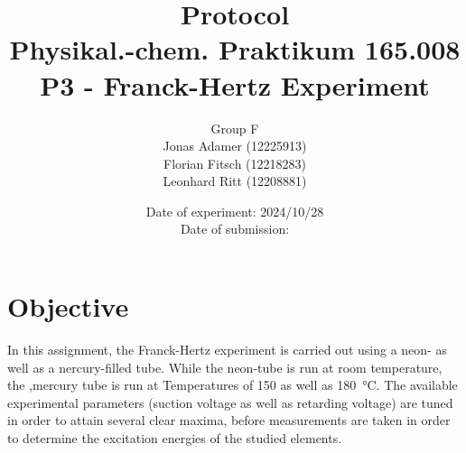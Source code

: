 \documentclass[titlepage]{article}
\title{Protocol \\ Physikal.-chem. Praktikum 165.008 \\ P3 - Franck-Hertz Experiment}
\author{Group F\\Jonas Adamer (12225913)\\Florian Fitsch (12218283)\\Leonhard Ritt (12208881)}
\date{Date of experiment: 2024/10/28\\Date of submission:}
\begin{document}
\maketitle
\thispagestyle{empty}

\newpage
\tableofcontents
\thispagestyle{empty}

\addtocounter{page}{-1}

\newpage
\section{Objective}
In this assignment, the Franck-Hertz experiment is carried out using a neon- as well as a nercury-filled tube. While the neon-tube is run at room temperature, the ,mercury tube is run at Temperatures of 150 as well as 180~°C. The available experimental parameters (suction voltage as well as retarding voltage) are tuned in order to attain several clear maxima, before measurements are taken in order to determine the excitation energies of the studied elements.
\end{document}
